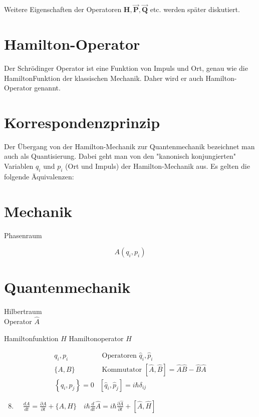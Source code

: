 \documentclass[10pt, letterpaper]{article}
\begin{document}
Weitere Eigenschaften der Operatoren $\mathbf{H}, \overrightarrow{\mathbf{P}}, \overrightarrow{\mathbf{Q}}$ etc. werden später diskutiert.

\section*{Hamilton-Operator}
Der Schrödinger Operator ist eine Funktion von Impuls und Ort, genau wie die HamiltonFunktion der klassischen Mechanik. Daher wird er auch Hamilton-Operator genannt.

\section*{Korrespondenzprinzip}
Der Übergang von der Hamilton-Mechanik zur Quantenmechanik bezeichnet man auch als Quantisierung. Dabei geht man von den "kanonisch konjungierten" Variablen $q_{i}$ und $p_{i}$ (Ort und Impuls) der Hamilton-Mechanik aus. Es gelten die folgende Äquivalenzen:

\section*{Mechanik}
Phasenraum

$$
A\left(q_{i}, p_{i}\right)
$$

\section*{Quantenmechanik}
Hilbertraum\\
Operator $\hat{A}$

Hamiltonfunktion $H$ Hamiltonoperator $\hat{H}$

$$
\begin{aligned}
q_{i}, p_{i} & \text { Operatoren } \hat{q}_{i}, \hat{p}_{i} \\
\{A, B\} & \text { Kommutator }[\hat{A}, \hat{B}]=\hat{A} \hat{B}-\hat{B} \hat{A} \\
\left\{q_{i}, p_{j}\right\}=0 & {\left[\hat{q}_{i}, \hat{p}_{j}\right]=i \hbar \delta_{i j} }
\end{aligned}
$$

\begin{enumerate}
  \setcounter{enumi}{7}
  \item $\quad \frac{d A}{d t}=\frac{\partial A}{\partial t}+\{A, H\} \quad i \hbar \frac{d}{d t} \hat{A}=i \hbar \frac{\partial \hat{A}}{\partial t}+[\hat{A}, \hat{H}]$
\end{enumerate}
\end{document}
